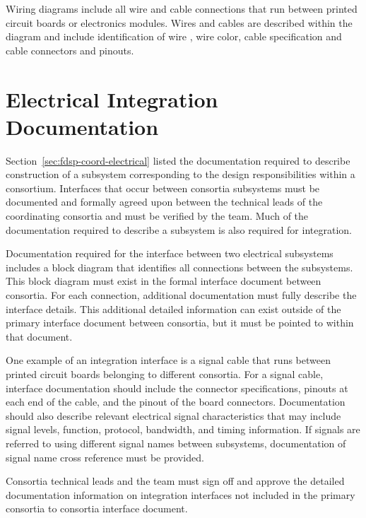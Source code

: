 Wiring diagrams include all wire and cable connections that
run between printed circuit boards or electronics modules.  Wires and
cables are described within the diagram and
include identification of wire , wire color, cable specification
and cable connectors and pinouts.




\section{Electrical Integration Documentation}
\label{sec:fdsp-coord-integ-electrical}

Section~\ref{sec:fdsp-coord-electrical} listed the documentation
required to describe construction of a subsystem corresponding to the
design responsibilities within a consortium.  Interfaces that occur
between consortia subsystems must be documented and formally agreed
upon between the technical leads of the coordinating consortia and
must be verified by the  team.  Much of the
documentation required to describe a subsystem is also required for
integration.


Documentation required for the interface between two electrical
subsystems includes a block diagram that identifies all connections
between the subsystems.  This block diagram must exist in the formal
interface document between consortia.  For each connection, additional
documentation must fully describe the interface
details. This additional detailed information can exist outside of the
primary interface document between consortia, but it must be pointed
to within that document.


One example of an integration interface is a signal cable that runs
between printed circuit boards belonging to different consortia.  For
a signal cable, interface documentation should include the connector
specifications, pinouts at each end of the cable, and the pinout of the
board connectors.  Documentation should also describe
relevant electrical signal characteristics that may include signal
levels, function, protocol, bandwidth, and timing information.  If
signals are referred to using different signal names between
subsystems, documentation of signal name cross reference must be
provided.


Consortia technical leads and the  team must sign off
and approve the detailed documentation information on integration
interfaces not included in the primary consortia to consortia
interface document.




